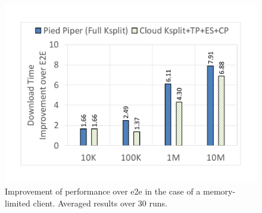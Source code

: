 \begin{figure}
  \centering
    \includegraphics[width=\columnwidth,trim=20mm 25mm 25mm 25mm,clip]{figures/WeakClient-Improvement.pdf}
    \caption{Improvement of \oursys performance over e2e in the case of a memory-limited client. Averaged results over 30 runs.} 
    \label{fig:oursys-weak-client}
\end{figure}





